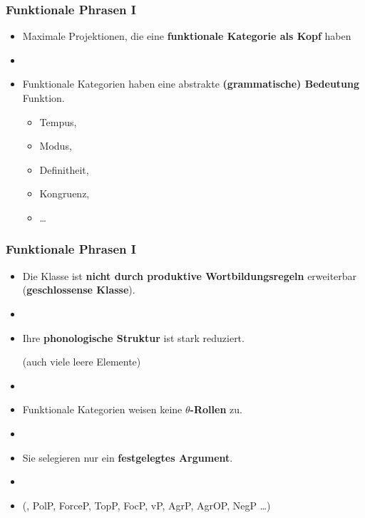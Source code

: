 \begin{frame}
\frametitle{Funktionale Phrasen I}

\begin{itemize}
	\item Maximale Projektionen, die eine \textbf{funktionale Kategorie als Kopf} haben
	\item[]
	\item Funktionale Kategorien haben eine abstrakte \textbf{(grammatische) Bedeutung} \ras Funktion.
	\begin{itemize}
		\item Tempus,
		\item Modus,
		\item Definitheit,
		\item Kongruenz,
		\item \dots
	\end{itemize}
		
\end{itemize}

\end{frame}


\begin{frame}
\frametitle{Funktionale Phrasen I}

\begin{itemize}
	
	\item Die Klasse ist \textbf{nicht durch produktive Wortbildungsregeln} erweiterbar (\textbf{geschlossense Klasse}).
	
	\item[]
	
	\item Ihre \textbf{phonologische Struktur} ist stark reduziert. 
	
	(\ras auch viele leere Elemente)
	
	\item[]
	
	\item Funktionale Kategorien weisen keine \textbf{$\theta$-Rollen} zu.
	
	\item[]
	
	\item Sie selegieren nur ein \textbf{festgelegtes Argument}.
	
	\item[]
	
	\item {} (, PolP, ForceP, TopP, FocP, vP, AgrP, AgrOP, NegP \dots )
	
\end{itemize}

\end{frame}


